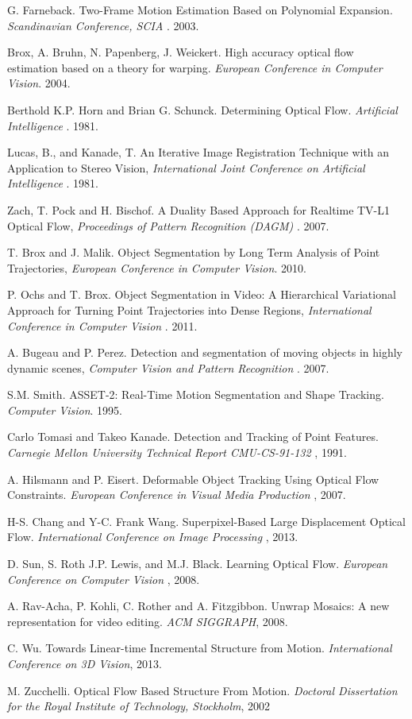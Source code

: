 \begin{thebibliography}{99}
G. Farneback. Two-Frame Motion Estimation Based on Polynomial Expansion. {\it Scandinavian Conference, SCIA }. 2003.

Brox, A. Bruhn, N. Papenberg, J. Weickert. High accuracy optical flow estimation based on a theory for warping. {\it European Conference in Computer Vision}. 2004.

Berthold K.P. Horn and Brian G. Schunck. Determining Optical Flow. {\it Artificial Intelligence }. 1981.

Lucas, B., and Kanade, T. An Iterative Image Registration Technique with an Application to Stereo Vision, {\it International Joint Conference on Artificial Intelligence }. 1981.

Zach, T. Pock and H. Bischof. A Duality Based Approach for Realtime TV-L1 Optical Flow, {\it Proceedings of Pattern Recognition (DAGM) }. 2007.

T. Brox and J. Malik. Object Segmentation by Long Term Analysis of Point Trajectories, {\it European Conference in Computer Vision}. 2010.

P. Ochs and T. Brox. Object Segmentation in Video: A Hierarchical Variational Approach for Turning Point Trajectories into Dense Regions, {\it International Conference in Computer Vision }. 2011.

A. Bugeau and P. Perez. Detection and segmentation of moving objects in highly dynamic scenes, {\it Computer Vision and Pattern Recognition }. 2007.

S.M. Smith. ASSET-2: Real-Time Motion Segmentation and Shape Tracking. {\it Computer Vision}. 1995. 

Carlo Tomasi and Takeo Kanade. Detection and Tracking of Point Features. {\it Carnegie Mellon University Technical Report CMU-CS-91-132 }, 1991.

A. Hilsmann and P. Eisert. Deformable Object Tracking Using Optical Flow Constraints. {\it European Conference in Visual Media Production }, 2007.

H-S. Chang and Y-C. Frank Wang. Superpixel-Based Large Displacement Optical Flow. {\it International Conference on Image Processing }, 2013.

D. Sun, S. Roth J.P. Lewis, and M.J. Black. Learning Optical Flow. {\it European Conference on Computer Vision }, 2008.

A. Rav-Acha, P. Kohli, C. Rother and A. Fitzgibbon. Unwrap Mosaics: A new representation for video editing. {\it ACM SIGGRAPH}, 2008. 

C. Wu. Towards Linear-time Incremental Structure from Motion. {\it International Conference on 3D Vision}, 2013.

M. Zucchelli. Optical Flow Based Structure From Motion. {\it Doctoral Dissertation for the Royal Institute of Technology, Stockholm}, 2002

\end{thebibliography}
